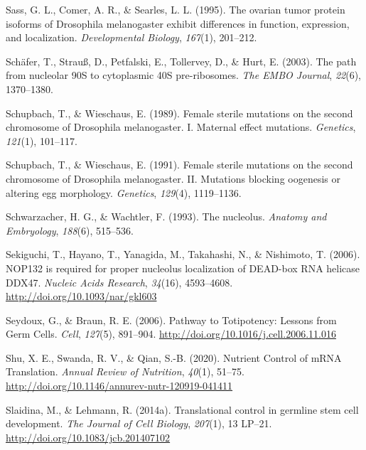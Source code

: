 \documentclass[12pt,twoside]{reedthesis}
\newlength{\cslhangindent}
\newenvironment{cslreferences}%
  {\setlength{\parindent}{0pt}%
  \everypar{\setlength{\hangindent}{\cslhangindent}}\ignorespaces}%
  {\par}
\begin{document}
\begin{cslreferences}
\leavevmode\hypertarget{ref-Sass1995}{}%
Sass, G. L., Comer, A. R., \& Searles, L. L. (1995). The ovarian tumor protein isoforms of Drosophila melanogaster exhibit differences in function, expression, and localization. \emph{Developmental Biology}, \emph{167}(1), 201--212.

\leavevmode\hypertarget{ref-Schafer2003a}{}%
Schäfer, T., Strauß, D., Petfalski, E., Tollervey, D., \& Hurt, E. (2003). The path from nucleolar 90S to cytoplasmic 40S pre-ribosomes. \emph{The EMBO Journal}, \emph{22}(6), 1370--1380.

\leavevmode\hypertarget{ref-Schupbach1989c}{}%
Schupbach, T., \& Wieschaus, E. (1989). Female sterile mutations on the second chromosome of Drosophila melanogaster. I. Maternal effect mutations. \emph{Genetics}, \emph{121}(1), 101--117.

\leavevmode\hypertarget{ref-Schupbach1991f}{}%
Schupbach, T., \& Wieschaus, E. (1991). Female sterile mutations on the second chromosome of Drosophila melanogaster. II. Mutations blocking oogenesis or altering egg morphology. \emph{Genetics}, \emph{129}(4), 1119--1136.

\leavevmode\hypertarget{ref-Schwarzacher1993}{}%
Schwarzacher, H. G., \& Wachtler, F. (1993). The nucleolus. \emph{Anatomy and Embryology}, \emph{188}(6), 515--536.

\leavevmode\hypertarget{ref-sekiguchiNOP132RequiredProper2006}{}%
Sekiguchi, T., Hayano, T., Yanagida, M., Takahashi, N., \& Nishimoto, T. (2006). NOP132 is required for proper nucleolus localization of DEAD-box RNA helicase DDX47. \emph{Nucleic Acids Research}, \emph{34}(16), 4593--4608. \url{http://doi.org/10.1093/nar/gkl603}

\leavevmode\hypertarget{ref-Seydoux2006}{}%
Seydoux, G., \& Braun, R. E. (2006). Pathway to Totipotency: Lessons from Germ Cells. \emph{Cell}, \emph{127}(5), 891--904. \url{http://doi.org/10.1016/j.cell.2006.11.016}

\leavevmode\hypertarget{ref-shuNutrientControlMRNA2020}{}%
Shu, X. E., Swanda, R. V., \& Qian, S.-B. (2020). Nutrient Control of mRNA Translation. \emph{Annual Review of Nutrition}, \emph{40}(1), 51--75. \url{http://doi.org/10.1146/annurev-nutr-120919-041411}

\leavevmode\hypertarget{ref-Slaidina2014h}{}%
Slaidina, M., \& Lehmann, R. (2014a). Translational control in germline stem cell development. \emph{The Journal of Cell Biology}, \emph{207}(1), 13 LP--21. \url{http://doi.org/10.1083/jcb.201407102}


\end{cslreferences}
\end{document}
